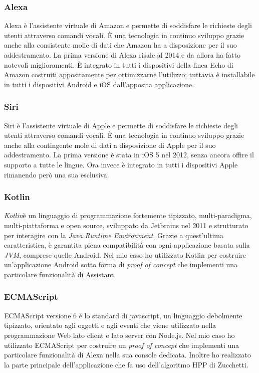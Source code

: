 		\subsubsection{Alexa}
		Alexa è l'assistente virtuale di Amazon e permette di soddisfare le richieste degli utenti attraverso comandi vocali. È una tecnologia in continuo sviluppo grazie anche alla consistente molie di dati che Amazon ha a disposizione per il suo addestramento. La prima versione di Alexa risale al 2014 e da allora ha fatto notevoli miglioramenti. È integrato in tutti i dispositivi della linea Echo di Amazon costruiti appositamente per ottimizzarne l'utilizzo; tuttavia è installabile in tutti i dispositivi Android e iOS dall'apposita applicazione.
		\subsubsection{Siri}
		Siri è l'assistente virtuale di Apple e permette di soddisfare le richieste degli utenti attraverso comandi vocali. È una tecnologia in continuo sviluppo grazie anche alla contingente mole di dati a disposizione di Apple per il suo addestramento. La prima versione è stata in iOS 5 nel 2012, senza ancora offire il supporto a tutte le lingue. Ora invece è integrato in tutti i dispositivi Apple rimanendo però una sua esclusiva.
		\subsubsection{Kotlin}
		\emph{Kotlin}\glsfirstoccur è un linguaggio di programmazione fortemente tipizzato, multi-paradigma, multi-piattaforma e open source, sviluppato da Jetbrains nel 2011 e strutturato per interagire con la \textit{Java Runtime Environment}. Grazie a quest'ultima caratteristica, è garantita piena compatibilità con ogni applicazione basata sulla \emph{JVM}\glsfirstoccur, comprese quelle Android. Nel mio caso ho utilizzato Kotlin per costruire un'applicazione Android sotto forma di \textit{proof of concept} che implementi una particolare funzionalità di Assistant.
		\subsubsection{ECMAScript}
		ECMAScript versione 6 è lo standard di javascript, un linguaggio debolmente tipizzato, orientato agli oggetti e agli eventi che viene utilizzato nella programmazione Web lato client e lato server con Node.js. Nel mio caso ho utilizzato ECMAScript per costruire un \textit{proof of concept} che implementi una particolare funzionalità di Alexa nella sua console dedicata. Inoltre ho realizzato la parte principale dell'applicazione che fa uso dell'algoritmo HPP di Zucchetti.
